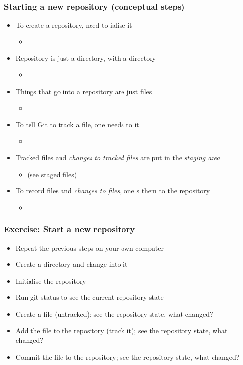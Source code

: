 \begin{frame}
\frametitle{Starting a new repository (conceptual steps)}
\begin{itemize}
    \item To create a repository, need to ialise it
        \begin{itemize}
            \item {}
        \end{itemize}
    \item Repository is just a directory, with a  directory
        \begin{itemize}
            \item {}
        \end{itemize}
    \item Things that go into a repository are just files
        \begin{itemize}
            \item {}
        \end{itemize}
    \item To tell Git to track a file, one needs to  it
        \begin{itemize}
            \item {}
        \end{itemize}
    \item Tracked files and \emph{changes to tracked files} are put in
        the \emph{staging area}
        \begin{itemize}
            \item {} (see staged files)
        \end{itemize}
    \item To record files and \emph{changes to files}, one s
        them to the repository
        \begin{itemize}
            \item {}
        \end{itemize}
\end{itemize}
\end{frame}

\begin{frame}
\frametitle{Exercise: Start a new repository}
\begin{itemize}
    \item Repeat the previous steps on your own computer
    \item Create a directory and change into it
    \item Initialise the repository
    \item Run git status to see the current repository state
    \item Create a file (untracked); see the repository state, what changed?
    \item Add the file to the repository (track it); see the repository
        state, what changed?
    \item Commit the file to the repository; see the repository state, what
        changed?
\end{itemize}
\end{frame}

